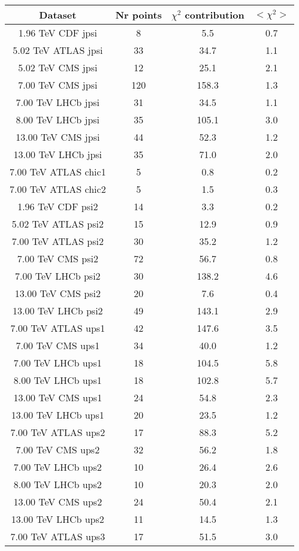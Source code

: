 \begin{table}[h!]
\centering
\begin{tabular}{c|c|c|c}
Dataset & Nr points & $\chi^2$ contribution & $<\chi^2>$ \\
\hline
1.96 TeV CDF jpsi & 8 & 5.5 & 0.7 \\
5.02 TeV ATLAS jpsi & 33 & 34.7 & 1.1 \\
5.02 TeV CMS jpsi & 12 & 25.1 & 2.1 \\
7.00 TeV CMS jpsi & 120 & 158.3 & 1.3 \\
7.00 TeV LHCb jpsi & 31 & 34.5 & 1.1 \\
8.00 TeV LHCb jpsi & 35 & 105.1 & 3.0 \\
13.00 TeV CMS jpsi & 44 & 52.3 & 1.2 \\
13.00 TeV LHCb jpsi & 35 & 71.0 & 2.0 \\
7.00 TeV ATLAS chic1 & 5 & 0.8 & 0.2 \\
7.00 TeV ATLAS chic2 & 5 & 1.5 & 0.3 \\
1.96 TeV CDF psi2 & 14 & 3.3 & 0.2 \\
5.02 TeV ATLAS psi2 & 15 & 12.9 & 0.9 \\
7.00 TeV ATLAS psi2 & 30 & 35.2 & 1.2 \\
7.00 TeV CMS psi2 & 72 & 56.7 & 0.8 \\
7.00 TeV LHCb psi2 & 30 & 138.2 & 4.6 \\
13.00 TeV CMS psi2 & 20 & 7.6 & 0.4 \\
13.00 TeV LHCb psi2 & 49 & 143.1 & 2.9 \\
7.00 TeV ATLAS ups1 & 42 & 147.6 & 3.5 \\
7.00 TeV CMS ups1 & 34 & 40.0 & 1.2 \\
7.00 TeV LHCb ups1 & 18 & 104.5 & 5.8 \\
8.00 TeV LHCb ups1 & 18 & 102.8 & 5.7 \\
13.00 TeV CMS ups1 & 24 & 54.8 & 2.3 \\
13.00 TeV LHCb ups1 & 20 & 23.5 & 1.2 \\
7.00 TeV ATLAS ups2 & 17 & 88.3 & 5.2 \\
7.00 TeV CMS ups2 & 32 & 56.2 & 1.8 \\
7.00 TeV LHCb ups2 & 10 & 26.4 & 2.6 \\
8.00 TeV LHCb ups2 & 10 & 20.3 & 2.0 \\
13.00 TeV CMS ups2 & 24 & 50.4 & 2.1 \\
13.00 TeV LHCb ups2 & 11 & 14.5 & 1.3 \\
7.00 TeV ATLAS ups3 & 17 & 51.5 & 3.0 \\

\end{tabular}
\end{table}
